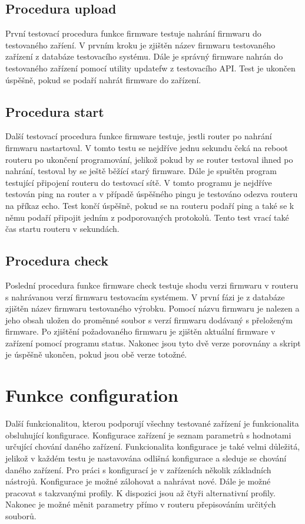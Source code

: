 \subsection{Procedura upload}
První testovací procedura funkce firmware testuje nahrání firmwaru do testovaného zaříení. V prvním kroku je zjištěn název firmwaru testovaného zařízení z databáze testovacího systému. Dále je správný firmware nahrán do testovaného zařízení pomocí utility updatefw z testovacího API. Test je ukončen úspěšně, pokud se podaří nahrát firmware do zařízení.

\subsection{Procedura start}
Další testovací procedura funkce firmware testuje, jestli router po nahrání firmwaru nastartoval. V tomto testu se nejdříve jednu sekundu čeká na reboot routeru po ukončení programování, jelikož pokud by se router testoval ihned po nahrání, testoval by se ještě běžící starý firmware. Dále je spuštěn program testující připojení routeru do testovací sítě. V tomto programu je nejdříve testován ping na router a v případě úspěšného pingu je testováno odezva routeru na příkaz echo. Test končí úspěšně, pokud se na routeru podaří ping a také se k němu podaří připojit jedním z podporovaných protokolů. Tento test vrací také čas startu routeru v sekundách.

\subsection{Procedura check}
Poslední procedura funkce firmware check testuje shodu verzi firmwaru v routeru s nahrávanou verzí firmwaru testovacím systémem. V první fázi je z databáze zjištěn název firmwaru testovaného výrobku. Pomocí názvu firmwaru je nalezen a jeho obsah uložen do proměnné soubor s verzí firmwaru dodávaný s přeloženým firmware. Po zjištění požadovaného firmwaru je zjištěn aktuální firmware v zařízení pomocí programu status. Nakonec jsou tyto dvě verze porovnány a skript je úspěšně ukončen, pokud jsou obě verze totožné.

\section{Funkce configuration}
Další funkcionalitou, kterou podporují všechny testované zařízení je funkcionalita obsluhující konfigurace. Konfigurace zařízení je seznam parametrů s hodnotami určující chování daného zařízení. Funkcionalita konfigurace je také velmi důležitá, jelikož v každém testu je nastavována odlišná konfigurace a sleduje se chování daného zařízení. Pro práci s konfigurací je v zařízeních několik základních nástrojů. Konfigurace je možné zálohovat a nahrávat nové. Dále je možné pracovat s takzvanými profily. K dispozici jsou až čtyři alternativní profily. Nakonec je možné měnit parametry přímo v routeru přepisováním určitých souborů.


